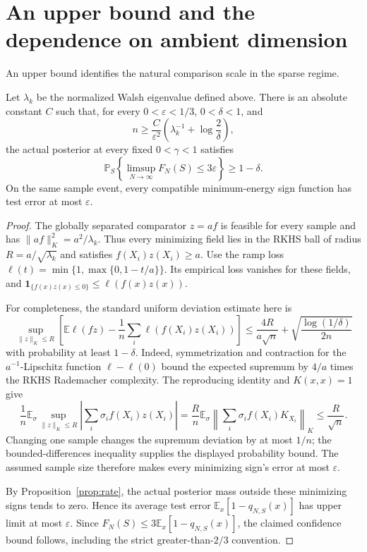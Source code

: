 \section{An upper bound and the dependence on ambient dimension}
\label{sec:upper-bound}
An upper bound identifies the natural comparison scale in the sparse
regime.

\begin{proposition}\label{prop:upper-bound}
Let $\lambda_k$ be the normalized Walsh eigenvalue defined above.
There is an absolute constant $C$ such that, for every
$0<\varepsilon<1/3$, $0<\delta<1$, and
\[
 n\ge \frac{C}{\varepsilon^2}
       \left(\lambda_k^{-1}+\log\frac2\delta\right),
\]
the actual posterior at every fixed $0<\gamma<1$ satisfies
\[
 \mathbb P_S\left\{\limsup_{N\to\infty}F_N(S)
                      \le3\varepsilon\right\}\ge1-\delta.
\]
On the same sample event, every compatible minimum-energy sign function
has test error at most $\varepsilon$.
\end{proposition}
\begin{proof}
The globally separated comparator $z=af$ is feasible for every sample
and has $\|af\|_K^2=a^2/\lambda_k$. Thus every minimizing field lies
in the RKHS ball of radius $R=a/\sqrt{\lambda_k}$ and satisfies
$f(X_i)z(X_i)\ge a$.
Use the ramp loss
$\ell(t)=\min\{1,\max\{0,1-t/a\}\}$.
Its empirical loss vanishes for these fields, and
$\mathbf1_{\{f(x)z(x)\le0\}}\le\ell(f(x)z(x))$.

For completeness, the standard uniform deviation estimate here is
\[
 \sup_{\|z\|_K\le R}
 \left[\mathbb E\ell(fz)-\frac1n\sum_i\ell(f(X_i)z(X_i))\right]
 \le \frac{4R}{a\sqrt n}
       +\sqrt{\frac{\log(1/\delta)}{2n}}
\]
with probability at least $1-\delta$.
Indeed, symmetrization and contraction for the $a^{-1}$-Lipschitz
function $\ell-\ell(0)$ bound the expected supremum by $4/a$ times
the RKHS Rademacher complexity. The reproducing identity and
$K(x,x)=1$ give
\[
 \frac1n\mathbb E_\sigma
 \sup_{\|z\|_K\le R}\left|\sum_i\sigma_i f(X_i)z(X_i)\right|
 =\frac Rn\mathbb E_\sigma
       \left\|\sum_i\sigma_i f(X_i)K_{X_i}\right\|_K
 \le\frac R{\sqrt n}.
\]
Changing one sample changes the supremum deviation by at most $1/n$;
the bounded-differences inequality supplies the displayed probability
bound. The assumed sample size therefore makes every minimizing
sign's error at most $\varepsilon$.

By Proposition~\ref{prop:rate}, the actual posterior mass outside these
minimizing signs tends to zero. Hence its average test error
$\mathbb E_x[1-q_{N,S}(x)]$ has upper limit at most $\varepsilon$.
Since $F_N(S)\le3\mathbb E_x[1-q_{N,S}(x)]$, the claimed confidence
bound follows, including the strict greater-than-$2/3$ convention.
\end{proof}

